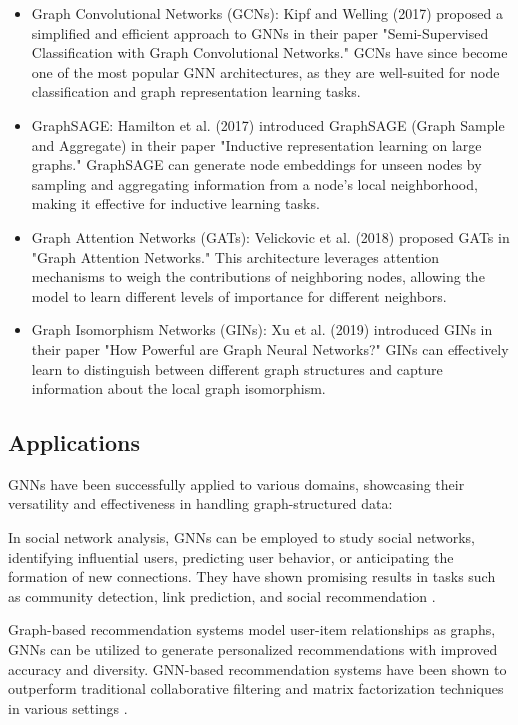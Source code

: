 \documentclass[final]{article}
\begin{document}
\begin{itemize}
\item Graph Convolutional Networks (GCNs): Kipf and Welling (2017) \cite{kipf2017} proposed a simplified and efficient approach to GNNs in their paper "Semi-Supervised Classification with Graph Convolutional Networks." GCNs have since become one of the most popular GNN architectures, as they are well-suited for node classification and graph representation learning tasks.

\item GraphSAGE: Hamilton et al. (2017) \cite{hamilton2017} introduced GraphSAGE (Graph Sample and Aggregate) in their paper "Inductive representation learning on large graphs." GraphSAGE can generate node embeddings for unseen nodes by sampling and aggregating information from a node's local neighborhood, making it effective for inductive learning tasks.

\item Graph Attention Networks (GATs): Velickovic et al. (2018) \cite{velivckovic2018} proposed GATs in "Graph Attention Networks." This architecture leverages attention mechanisms to weigh the contributions of neighboring nodes, allowing the model to learn different levels of importance for different neighbors.

\item Graph Isomorphism Networks (GINs): Xu et al. (2019) \cite{xu2019} introduced GINs in their paper "How Powerful are Graph Neural Networks?" GINs can effectively learn to distinguish between different graph structures and capture information about the local graph isomorphism.
\end{itemize}

\subsection{Applications}

GNNs have been successfully applied to various domains, showcasing their versatility and effectiveness in handling graph-structured data:

In social network analysis, GNNs can be employed to study social networks, identifying influential users, predicting user behavior, or anticipating the formation of new connections. They have shown promising results in tasks such as community detection, link prediction, and social recommendation \cite{zhang2018}.

Graph-based recommendation systems model user-item relationships as graphs, GNNs can be utilized to generate personalized recommendations with improved accuracy and diversity. GNN-based recommendation systems have been shown to outperform traditional collaborative filtering and matrix factorization techniques in various settings \cite{ying2018}.
\end{document}
